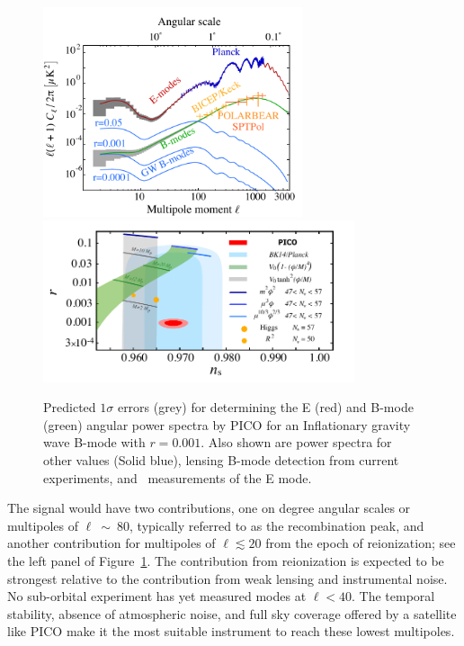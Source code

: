 \documentclass[PICOReport.tex]{subfiles}
\begin{document}
\begin{figure}[!htb]
\centering
\hspace{-0.15in}
\includegraphics[width=3in]{images/cmb_powspec_PICOv2.pdf}
\hspace{-0.15in}
\includegraphics[width=3.6in]{images/nsrlabeledrp001_PICOv1.pdf}
\caption{Predicted $1\sigma$ errors (grey) for determining the E (red) and B-mode (green) angular power 
spectra by PICO for an Inflationary gravity wave B-mode with $r=0.001$.   Also shown are power spectra 
for other values (Solid blue), lensing B-mode detection from current experiments, 
and \planck~measurements of the E mode.  
 }
\label{fig:clbb}
\end{figure}

The signal would have two contributions, one on degree angular scales or multipoles of $\ell~\sim~80$, 
typically referred to as the recombination peak, and another contribution for multipoles of $\ell\lesssim 20$ 
from the epoch of reionization; see the left panel of Figure~\ref{fig:clbb}. The contribution from reionization 
is expected 
to be strongest relative to the contribution from weak lensing and instrumental noise.  
No sub-orbital experiment has yet measured modes at $\ell<40$. The temporal stability, absence of 
atmospheric noise, and full sky coverage offered by a satellite like PICO make it
the most suitable instrument to reach these lowest multipoles.  
\end{document}
